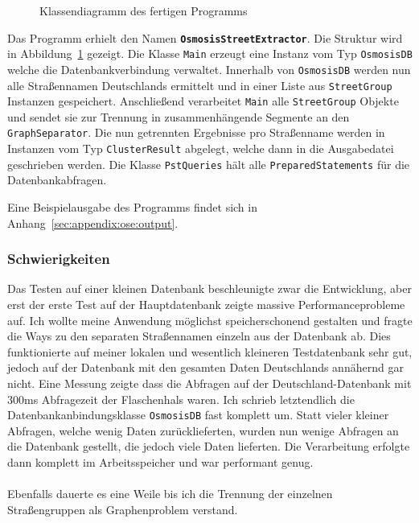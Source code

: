 \begin{figure}[htb]
   \centering
   \caption{Klassendiagramm des fertigen Programms}
   \label{fig:ose:uml}
 \end{figure}

Das Programm erhielt den Namen \textbf{\texttt{OsmosisStreetExtractor}}. Die Struktur wird in Abbildung~\ref{fig:ose:uml} gezeigt.
Die Klasse \texttt{Main} erzeugt eine Instanz vom Typ \texttt{OsmosisDB} welche die Datenbankverbindung verwaltet.
Innerhalb von \texttt{OsmosisDB} werden nun alle Straßennamen Deutschlands ermittelt und in einer Liste aus \texttt{StreetGroup} Instanzen gespeichert.
Anschließend verarbeitet \texttt{Main} alle \texttt{StreetGroup} Objekte und sendet sie zur Trennung in zusammenhängende Segmente an den \texttt{GraphSeparator}.
Die nun getrennten Ergebnisse pro Straßenname werden in Instanzen vom Typ \texttt{ClusterResult} abgelegt, welche dann in die Ausgabedatei geschrieben werden.
Die Klasse \texttt{PstQueries} hält alle \texttt{PreparedStatements} für die Datenbankabfragen.

Eine Beispielausgabe des Programms findet sich in Anhang~\ref{sec:appendix:ose:output}.

\subsubsection{Schwierigkeiten}
Das Testen auf einer kleinen Datenbank beschleunigte zwar die Entwicklung, aber erst der erste Test auf der Hauptdatenbank zeigte massive Performanceprobleme auf.
Ich wollte meine Anwendung möglichst speicherschonend gestalten und fragte die Ways zu den separaten Straßennamen  einzeln aus der Datenbank ab.
Dies funktionierte auf meiner lokalen und wesentlich kleineren Testdatenbank sehr gut, jedoch auf der Datenbank mit den gesamten Daten Deutschlands annähernd gar nicht.
Eine Messung zeigte dass die Abfragen auf der Deutschland-Datenbank mit 300ms Abfragezeit der Flaschenhals waren.
Ich schrieb letztendlich die Datenbankanbindungsklasse \texttt{OsmosisDB} fast komplett um.
Statt vieler kleiner Abfragen, welche wenig Daten zurücklieferten, wurden nun wenige Abfragen an die Datenbank gestellt, die jedoch viele Daten lieferten.
Die Verarbeitung erfolgte dann komplett im Arbeitsspeicher und war performant genug.\\\\
Ebenfalls dauerte es eine Weile bis ich die Trennung der einzelnen Straßengruppen als Graphenproblem verstand.

